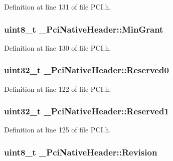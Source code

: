 Definition at line 131 of file P\+C\+I.\+h.

\subsubsection[{\texorpdfstring{Min\+Grant}{MinGrant}}]{\setlength{\rightskip}{0pt plus 5cm}uint8\+\_\+t \+\_\+\+Pci\+Native\+Header\+::\+Min\+Grant}\hypertarget{struct__PciNativeHeader_a5c11c079111e6235bd01540b9affdb8b}{}\label{struct__PciNativeHeader_a5c11c079111e6235bd01540b9affdb8b}


Definition at line 130 of file P\+C\+I.\+h.

\subsubsection[{\texorpdfstring{Reserved0}{Reserved0}}]{\setlength{\rightskip}{0pt plus 5cm}uint32\+\_\+t \+\_\+\+Pci\+Native\+Header\+::\+Reserved0}\hypertarget{struct__PciNativeHeader_ac6854a65538b035591311219fc52b973}{}\label{struct__PciNativeHeader_ac6854a65538b035591311219fc52b973}


Definition at line 122 of file P\+C\+I.\+h.

\subsubsection[{\texorpdfstring{Reserved1}{Reserved1}}]{\setlength{\rightskip}{0pt plus 5cm}uint32\+\_\+t \+\_\+\+Pci\+Native\+Header\+::\+Reserved1}\hypertarget{struct__PciNativeHeader_a34aafe4c4f8bcc909d2fad92f04c1c6c}{}\label{struct__PciNativeHeader_a34aafe4c4f8bcc909d2fad92f04c1c6c}


Definition at line 125 of file P\+C\+I.\+h.

\subsubsection[{\texorpdfstring{Revision}{Revision}}]{\setlength{\rightskip}{0pt plus 5cm}uint8\+\_\+t \+\_\+\+Pci\+Native\+Header\+::\+Revision}\hypertarget{struct__PciNativeHeader_a655b55f4aec8aa162568754a43e61117}{}\label{struct__PciNativeHeader_a655b55f4aec8aa162568754a43e61117}


